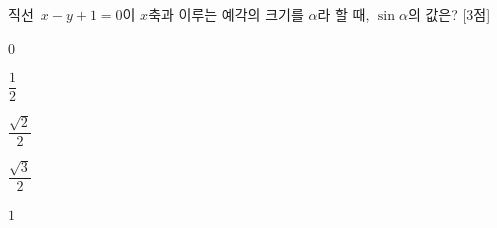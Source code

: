 직선~$x-y+1=0$이 $x$축과 이루는 예각의 크기를 $\alpha$라 할 때, $\sin\alpha$의 값은? \mbox{[3점]}
\begin{choices32}{\rule[-3ex]{0pt}{8ex}$0$}{\rule[-3ex]{0pt}{8ex}$\dfrac{1}{2}$}{\rule[-3ex]{0pt}{8ex}$\dfrac{\sqrt{2}}{2}$}{\rule[-3ex]{0pt}{8ex}$\dfrac{\sqrt{3}}{2}$}{\rule[-3ex]{0pt}{8ex}$1$}\end{choices32}
